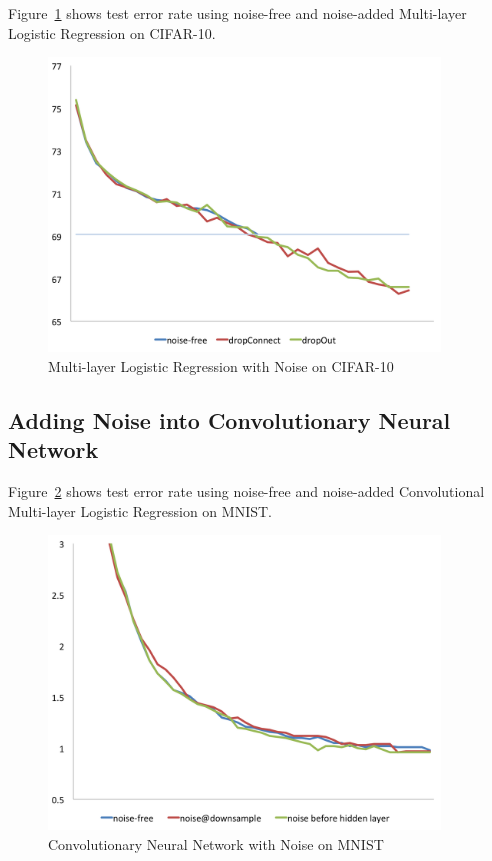 Figure~\ref{mlp10} shows test error rate using noise-free and noise-added
Multi-layer Logistic Regression on CIFAR-10.
\begin{figure}[!htbp]
\centering
\includegraphics[width=295pt]{f-figs/mlp10.png}
\caption{Multi-layer Logistic Regression with Noise on CIFAR-10}
\label{mlp10}
\end{figure}

\subsection{Adding Noise into Convolutionary Neural Network}
Figure~\ref{convo} shows test error rate using noise-free and noise-added
Convolutional Multi-layer Logistic Regression on MNIST.
\begin{figure}[!htbp]
\centering
\includegraphics[width=295pt]{f-figs/convo.png}
\caption{Convolutionary Neural Network with Noise on MNIST}
\label{convo}
\end{figure}

